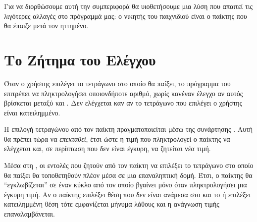 \documentclass[a4paper,11pt,oneside]{book}
\begin{document}
Για να διορθώσουμε αυτή την συμπεριφορά θα υιοθετήσουμε μια λύση που απαιτεί τις λιγότερες αλλαγές στο πρόγραμμά μας: ο νικητής του παιχνιδιού είναι ο παίκτης που θα έπαιζε μετά τον ηττημένο.


\section{Το Ζήτημα του Ελέγχου}

\begin{question}
Όταν ο χρήστης επιλέγει το τετράγωνο στο οποίο θα παίξει, το πρόγραμμα του επιτρέπει να πληκτρολογήσει οποιονδήποτε αριθμό, χωρίς κανέναν έλεγχο αν αυτός βρίσκεται μεταξύ  και . Δεν ελέγχεται καν αν το τετράγωνο που επιλέγει ο χρήστης είναι κατειλημμένο.
\end{question}

Η επιλογή τετραγώνου από τον παίκτη πραγματοποιείται μέσω της συνάρτησης . Αυτή θα πρέπει τώρα να \emph{επεκταθεί}, έτσι ώστε η τιμή που πληκτρολογεί ο παίκτης να ελέγχεται και, σε περίπτωση που δεν είναι έγκυρη, να ζητείται νέα τιμή.

Μέσα στη , οι εντολές που ζητούν από τον παίκτη να επιλέξει το τετράγωνο στο οποίο θα παίξει θα τοποθετηθούν πλέον μέσα σε μια επαναληπτική δομή. Έτσι, ο παίκτης θα ``εγκλωβίζεται'' σε έναν κύκλο από τον οποίο βγαίνει μόνο όταν πληκτρολογήσει μια έγκυρη τιμή. Αν ο παίκτης επιλέξει θέση που δεν είναι ανάμεσα στο  και το  ή επιλέξει κατειλημμένη θέση τότε εμφανίζεται μήνυμα λάθους και η ανάγνωση τιμής επαναλαμβάνεται.


\end{document}
